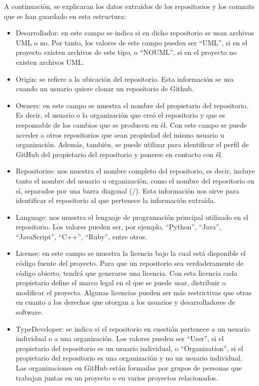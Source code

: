 \documentclass[a4paper, 12pt]{book}
\begin{document}
A continuación, se explicaran los datos extraídos de los repositorios y los commits que se han guardado en esta estructura:
\begin{itemize}
  \item Desarrollador: en este campo se indica si en dicho repositorio se usan archivos UML o no.
  Por tanto, los valores de este campo pueden ser ``UML'', si en el proyecto existen archivos de este tipo, o ``NOUML'', si en el proyecto no existen archivos UML.
  
  \item Origin: se refiere a la ubicación del repositorio.
  Esta información se usa cuando un usuario quiere clonar un repositorio de Github.
  
  \item Owners: en este campo se muestra el nombre del propietario del repositorio. 
  Es decir, el usuario o la organización que creó el repositorio y que es responsable de los cambios que se producen en él. 
  Con este campo se puede acceder a otros repositorios que sean propiedad del mismo usuario u organización. 
  Además, también, se puede utilizar para identificar el perfil de GitHub del propietario del repositorio y ponerse en contacto con él.
  
  \item Repositories: nos muestra el nombre completo del repositorio, es decir, incluye tanto el nombre del usuario u organización, como el nombre del repositorio en sí, separados por una barra diagonal (/).
  Esta información nos sirve para identificar el repositorio al que pertenece la información extraída.

  \item Language: nos muestra el lenguaje de programación principal utilizado en el repositorio.
  Los valores pueden ser, por ejemplo, ``Python'', ``Java'', ``JavaScript'', ``C++'', ``Ruby'', entre otros.
  
  \item License: en este campo se muestra la licencia bajo la cual está disponible el código fuente del proyecto.
  Para que un repositorio sea verdaderamente de código abierto, tendrá que generarse una licencia. 
  Con esta licencia cada propietario define el marco legal en el que se puede usar, distribuir o modificar el proyecto.
  Algunas licencias pueden ser más restrictivas que otras en cuanto a los derechos que otorgan a los usuarios y desarrolladores de software.
  
  \item TypeDeveloper: se indica si el repositorio en cuestión pertenece a un usuario individual o a una organización. 
  Los valores pueden ser ``User'', si el propietario del repositorio es un usuario individual, o ``Organization'', si el propietario del repositorio es una organización y no un usuario individual. 
  Las organizaciones en GitHub están formadas por grupos de personas que trabajan juntas en un proyecto o en varios proyectos relacionados.
  

\end{itemize}
\end{document}

